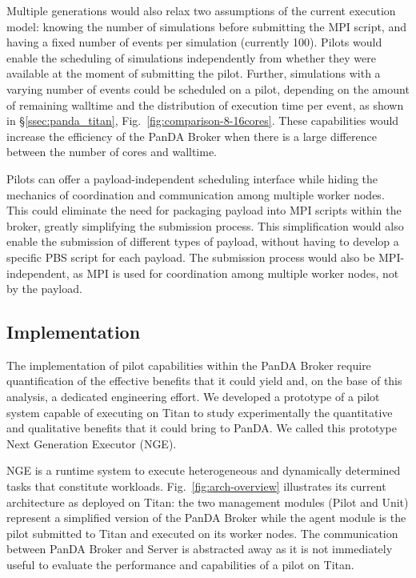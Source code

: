 Multiple generations would also relax two assumptions of the current
execution model: knowing the number of simulations before submitting the MPI
script, and having a fixed number of events per simulation (currently 100).
Pilots would enable the scheduling of simulations independently from whether
they were available at the moment of submitting the pilot. Further,
simulations with a varying number of events could be scheduled on a pilot,
depending on the amount of remaining walltime and the distribution of
execution time per event, as shown in \S\ref{ssec:panda_titan},
Fig.~\ref{fig:comparison-8-16cores}. These capabilities would increase the
efficiency of the PanDA Broker when there is a large difference between the
number of cores and walltime.

Pilots can offer a payload-independent scheduling interface while hiding the
mechanics of coordination and communication among multiple worker nodes. This
could eliminate the need for packaging payload into MPI scripts within the
broker, greatly simplifying the submission process. This simplification would
also enable the submission of different types of payload, without having to
develop a specific PBS script for each payload. The submission process would
also be MPI-independent, as MPI is used for coordination among multiple
worker nodes, not by the payload.

\subsection{Implementation}
\label{sec:arch}

The implementation of pilot capabilities within the PanDA Broker require
quantification of the effective benefits that it could yield and, on the base
of this analysis, a dedicated engineering effort. We developed a prototype of
a pilot system capable of executing on Titan to study experimentally the
quantitative and qualitative benefits that it could bring to PanDA\@. We
called this prototype Next Generation Executor (NGE).

NGE is a runtime system to execute heterogeneous and dynamically determined
tasks that constitute workloads. Fig.~\ref{fig:arch-overview} illustrates its
current architecture as deployed on Titan: the two management modules (Pilot
and Unit) represent a simplified version of the PanDA Broker while the agent
module is the pilot submitted to Titan and executed on its worker nodes. The
communication between PanDA Broker and Server is abstracted away as it is not
immediately useful to evaluate the performance and capabilities of a pilot on
Titan.

